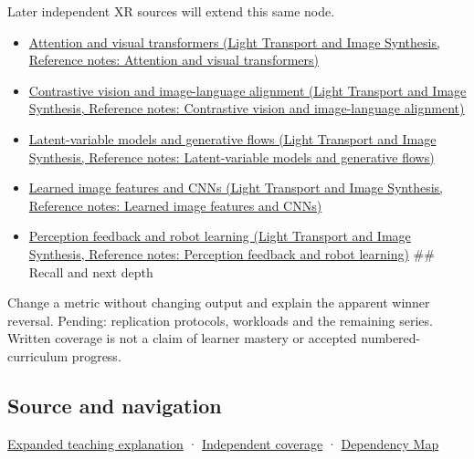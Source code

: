 Later independent XR sources will extend this same node.

\begin{itemize}
\tightlist
\item
  \href{../04-Light-Transport-and-Image-Synthesis/main.pdf\#nameddest=appendix-a9d5dfdd164a}{Attention and visual transformers (Light Transport and Image Synthesis, Reference notes: Attention and visual transformers)}
\item
  \href{../04-Light-Transport-and-Image-Synthesis/main.pdf\#nameddest=appendix-772f1fd96148}{Contrastive vision and image-language alignment (Light Transport and Image Synthesis, Reference notes: Contrastive vision and image-language alignment)}
\item
  \href{../04-Light-Transport-and-Image-Synthesis/main.pdf\#nameddest=appendix-2c568f05ee34}{Latent-variable models and generative flows (Light Transport and Image Synthesis, Reference notes: Latent-variable models and generative flows)}
\item
  \href{../04-Light-Transport-and-Image-Synthesis/main.pdf\#nameddest=appendix-47c51ea026fb}{Learned image features and CNNs (Light Transport and Image Synthesis, Reference notes: Learned image features and CNNs)}
\item
  \href{../04-Light-Transport-and-Image-Synthesis/main.pdf\#nameddest=appendix-b0c42da325f1}{Perception feedback and robot learning (Light Transport and Image Synthesis, Reference notes: Perception feedback and robot learning)} \#\# Recall and next depth
\end{itemize}

Change a metric without changing output and explain the apparent winner reversal. Pending: replication protocols, workloads and the remaining series. Written coverage is not a claim of learner mastery or accepted numbered-curriculum progress.

\subsection{Source and navigation}\label{appendix-65788587ef78-source-and-navigation}

\hypertarget{appendix-65788587ef78-source-and-navigation}{}

\hyperref[04-visual-computing-ii-ch042-make-the-mathematics-operational-without-pretending-to-run-a-human-study]{Expanded teaching explanation} · \hyperref[appendix-fd090d982a15-xr01---independent-seeing-and-representation-source]{Independent coverage} · \hyperref[appendix-4ad47bdd269a]{Dependency Map}
